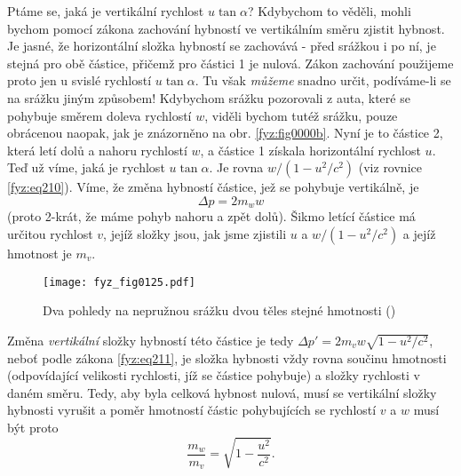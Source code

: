    Ptáme se, jaká je vertikální rychlost \(u\tan\alpha\)? Kdybychom to věděli, mohli bychom pomocí 
    zákona zachování hybností ve vertikálním směru zjistit hybnost. Je jasné, že horizontální 
    složka hybností se zachovává - před srážkou i po ní, je stejná pro obě částice, přičemž pro 
    částici 1 je nulová. Zákon zachování použijeme proto jen u svislé rychlostí \(u\tan\alpha\). Tu 
    však \emph{můžeme} snadno určit, podíváme-li se na srážku jiným způsobem! Kdybychom srážku 
    pozorovali z auta, které se pohybuje směrem doleva rychlostí \(w\), viděli bychom tutéž srážku, 
    pouze obrácenou naopak, jak je znázorněno na obr. \ref{fyz:fig0000b}. Nyní je to částice 2, 
    která letí dolů a nahoru rychlostí \(w\), a částice 1 získala horizontální rychlost \(u\). Teď 
    už víme, jaká je rychlost \(u\tan\alpha\). Je rovna \(w/(1 - u^2/c^2)\) (viz rovnice 
    \ref{fyz:eq210}). Víme, že změna hybností částice, jež se pohybuje vertikálně, je
    \begin{equation}\label{fyz:eq212}
      \Delta p = 2m_ww
    \end{equation}
    (proto 2-krát, že máme pohyb nahoru a zpět dolů). Šikmo letící částice má určitou rychlost 
    \(v\), jejíž složky jsou, jak jsme zjistili \(u\) a \(w/(1 - u^2/c^2)\) a jejíž hmotnost je 
    \(m_v\).
    
    \begin{figure}[ht!]  %
      \centering
      \texttt{[image: fyz\_fig0125.pdf]}
      \caption{Dva pohledy na nepružnou srážku dvou těles stejné hmotnosti
               (\cite[s.~233]{Feynman01})}
      \label{fyz:fig0125}
    \end{figure}
    
    Změna \emph{vertikální} složky hybností této částice je tedy \(\Delta p' =2m_vw\sqrt{1 - 
    u^2/c^2}\), neboť podle zákona \ref{fyz:eq211}, je složka hybnosti vždy rovna součinu hmotnosti 
    (odpovídající velikosti rychlosti, jíž se částice pohybuje) a složky rychlosti v daném směru. 
    Tedy, aby byla celková hybnost nulová, musí se vertikální složky hybnosti vyrušit a poměr 
    hmotností částic pohybujících se rychlostí \(v\) a \(w\) musí být proto
    \begin{equation}\label{fyz:eq213}
      \frac{m_w}{m_v} = \sqrt{1 - \dfrac{u^2}{c^2}}.
    \end{equation}
    
